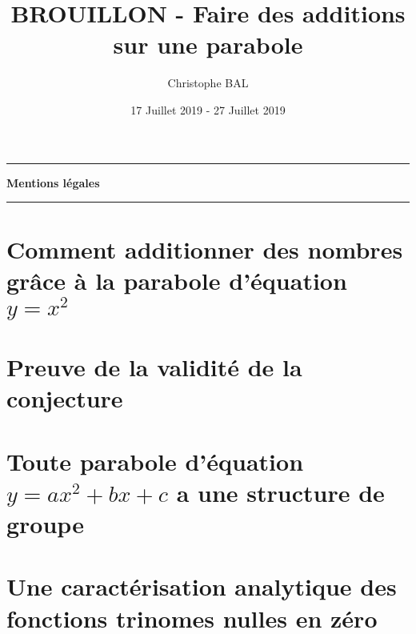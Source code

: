\documentclass[12pt]{amsart}
\begin{document}
\title{BROUILLON - Faire des additions sur une parabole}
\author{Christophe BAL}
\date{17 Juillet 2019 - 27 Juillet 2019}
\maketitle


\vspace{-.9em}


\begin{center}
	\hrule\vspace{.3em}
	{
		\fontsize{1.35em}{1em}\selectfont
		\textbf{Mentions \og légales \fg}
	}
			
	\vspace{0.45em}
	\doclicenseThis
	\hrule
\end{center}



\setcounter{tocdepth}{2}
\tableofcontents



\section{\texorpdfstring{Comment additionner des nombres grâce à la parabole d'équation $y = x^2$}%
                        {Comment additionner des nombres grâce à la parabole d'équation y = x**2}}





\section{Preuve de la validité de la conjecture} \label{proof}
\label{proof}





\section{\texorpdfstring{Toute parabole d'équation $y = a x^2 + b x + c$ a une structure de groupe}%
                        {Toute parabole d'équation y = a x**2 + b x + c a une structure de groupe}}
      




\section{Une caractérisation analytique des fonctions trinomes nulles en zéro}
      

\end{document}
